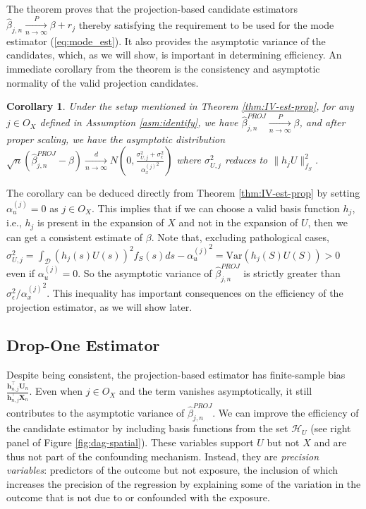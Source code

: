 \documentclass[
  12pt]{article}
\newcommand{\pnlim}{\xrightarrow[n \to \infty]{P}}
\newcommand{\dnlim}{\xrightarrow[n \to \infty]{d}}
\newcommand{\calD}{\mathcal{D}}
\newcommand{\calH}{\mathcal{H}}
\newcommand{\bX}{\boldsymbol{X}}
\newcommand{\bh}{\boldsymbol{h}}
\newcommand{\bU}{\boldsymbol{U}}
\newtheorem{corollary}{Corollary}
\begin{document}
The theorem proves that the projection-based candidate estimators $\hat \beta_{j,n} \pnlim \beta + r_j$ thereby satisfying the requirement to be used for the mode estimator (\ref{eq:mode_est}). It also provides the asymptotic variance of the candidates, which, as we will show, is important in determining efficiency. An immediate corollary from the theorem is the consistency and asymptotic normality of the valid projection candidates. 
\begin{corollary}\label{cor:IV-consistent}
    Under the setup mentioned in Theorem \ref{thm:IV-est-prop}, for any $j \in O_X$ defined in Assumption \ref{asm:identify}, we have $\hat{\beta}_{j,n}^{PROJ} \pnlim \beta$, and after proper scaling, we have the asymptotic distribution  $\sqrt{n}\left(\hat{\beta}_{j,n}^{PROJ}-\beta\right)  \dnlim N\left(0,  \frac{\sigma^2_{U,j}+ \sigma^2_\epsilon}{{\alpha_x^{(j)}}^2}\right)$
    where $\sigma^2_{U,j}$ reduces to $\|h_j U\|^2_{f_S}$.
\end{corollary}
The corollary can be deduced directly from Theorem \ref{thm:IV-est-prop} by setting $\alpha_u^{(j)}=0$ as $j \in O_X$. This implies that if we can choose a valid basis function $h_j$, i.e., $h_j$ is present in the expansion of $X$ and not in the expansion of $U$, then we can get a consistent estimate of $\beta$. Note that, excluding pathological cases, $\sigma^2_{U,j}=\int_\calD (h_j(s)U(s))^2f_S(s)ds - {\alpha_u^{(j)}}^2 = \text{Var}(h_j(S)U(S)) > 0$  even if $\alpha_u^{(j)}=0$. So the asymptotic variance of $\hat{\beta}_{j,n}^{PROJ}$ is strictly greater than $\sigma^2_\epsilon/{\alpha_x^{(j)}}^2$. This inequality has important consequences on the efficiency of the projection estimator, as we will show later.

\subsection{Drop-One Estimator}\label{sec:drop-one-method}
Despite being consistent, the projection-based estimator has finite-sample bias $\frac{\bh_{n,j}^\top\bU_n}{\bh_{n,j}^\top\bX_n}$. Even when $j \in O_{X}$ and the term vanishes asymptotically, it still contributes to the asymptotic variance of $\hat{\beta}_{j,n}^{PROJ}$. We can improve the efficiency of the candidate estimator by including basis functions from the set $\calH_U$ (see right panel of Figure \ref{fig:dag-spatial}). These variables support $U$ but not $X$ and are thus not part of the confounding mechanism. Instead, they are \textit{precision variables}: predictors of the outcome but not exposure, the inclusion of which increases the precision of the regression by explaining some of the variation in the outcome that is not due to or confounded with the exposure. 
\end{document}
